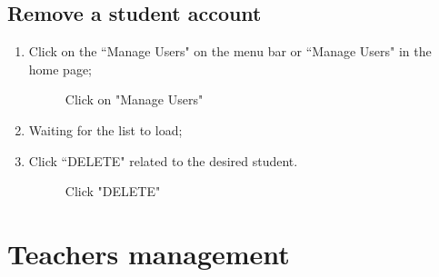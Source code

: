 \documentclass[ManualeUtente]{subfiles}
\begin{document}
\subsection{Remove a student account}
\begin{enumerate}
	\item Click on the \textquotedblleft Manage Users" on the menu bar or \textquotedblleft Manage Users" in the home page;
	\begin{figure}[H]
		\centering
		\caption{Click on "Manage Users"}
		\label{fig:Click on "Manage Users"}
	\end{figure}
	\item Waiting for the list to load;
	\item Click \textquotedblleft DELETE" related to the desired student.
	\begin{figure}[H]
		\centering
		\caption{Click "DELETE"}
		\label{fig:Click "DELETE"}
	\end{figure}
\end{enumerate}

\section{Teachers management}
\end{document}

